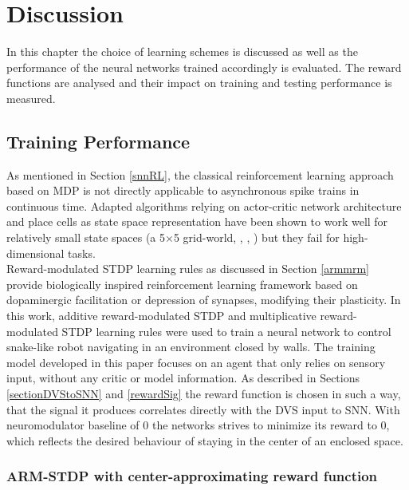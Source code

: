 
\chapter{Discussion}\label{chapter:discussion}

In this chapter the choice of learning schemes is discussed as well as the performance of the neural networks trained accordingly is evaluated. The reward functions are analysed and their impact on training and testing performance is measured.

\section{Training Performance}
As mentioned in Section \ref{snnRL}, the classical reinforcement learning approach based on MDP is not directly applicable to asynchronous spike trains in continuous time. Adapted algorithms relying on actor-critic network architecture and place cells as state space representation have been shown to work well for relatively small state spaces (a 5\(\times\)5 grid-world, \cite{18}, \cite{19}, \cite{21}) but they fail for high-dimensional tasks. \\
Reward-modulated STDP learning rules as discussed in Section \ref{armmrm} provide biologically inspired reinforcement learning framework based on dopaminergic facilitation or depression of synapses, modifying their plasticity. In this work, additive reward-modulated STDP and multiplicative reward-modulated STDP learning rules were used to train a neural network to control snake-like robot navigating in an environment closed by walls. The training model developed in this paper focuses on an agent that only relies on sensory input, without any critic or model information. As described in Sections \ref{sectionDVStoSNN} and \ref{rewardSig} the reward function is chosen in such a way, that the signal it produces correlates directly with the DVS input to SNN. With neuromodulator baseline of 0 the networks strives to minimize its reward to 0, which reflects the desired behaviour of staying in the center of an enclosed space. 

\subsection{ARM-STDP with center-approximating reward function}

